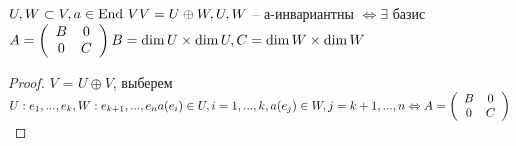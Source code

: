 \begin{Lm}
	$U, W \subset V, a \in \operatorname{End} \, V\\
	V = U \oplus W, U, W$ -- а-инвариантны $\Leftrightarrow \exists$ базис $A = \left(\begin{array}{cc}
		B & 0\\
		0 & C
	\end{array}\right)\\
	B = \dim U \times \dim U, C = \dim W \times \dim W$
\end{Lm}

\begin{proof}
	$V$ = $U \oplus V$, выберем $U: e_1, ..., e_k, W: e_{k+1}, ..., e_n\\
	a(e_i) \in U, i = 1, ..., k, a(e_j) \in W, j = k+1, ..., n \Leftrightarrow A = \left(\begin{array}{cc}
		B & 0\\
		0 & C
	\end{array}\right)$
\end{proof}

